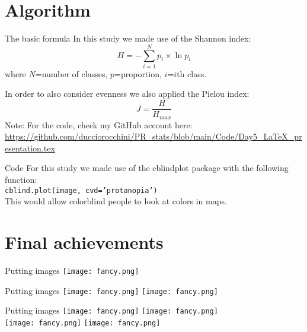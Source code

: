 \documentclass{beamer}
\begin{document}
\section{Algorithm}

\begin{frame}{The basic formula}
In this study we made use of the Shannon index:
    \begin{equation}
        H = - \sum_{i=1}^N p_i \times \ln p_i
    \end{equation}
where $N$=number of classes, $p$=proportion, $i$=$i$th class.

In order to also consider evenness we also applied the Pielou index:
    \begin{equation}
        J = \frac{H}{H_{max}}
    \end{equation}
\tiny{Note: For the code, check my GitHub account here: \url{https://github.com/ducciorocchini/PR_stats/blob/main/Code/Day5_LaTeX_presentation.tex}}
\end{frame}

\begin{frame}{Code}
For this study we made use of the cblindplot package with the following function:\\
\bigskip
\texttt{cblind.plot(image, cvd='protanopia')} \\
\bigskip
This would allow colorblind people to look at colors in maps.
\end{frame}

\section{Final achievements}
\begin{frame}{Putting images}
        \centering
        \texttt{[image: fancy.png]}
\end{frame}

\begin{frame}{Putting images}
        \centering
        \texttt{[image: fancy.png]}
        \texttt{[image: fancy.png]}  
\end{frame}

\begin{frame}{Putting images}
        \centering
        \texttt{[image: fancy.png]}
        \texttt{[image: fancy.png]}\\  
        \texttt{[image: fancy.png]}
        \texttt{[image: fancy.png]}  
\end{frame}
\end{document}
